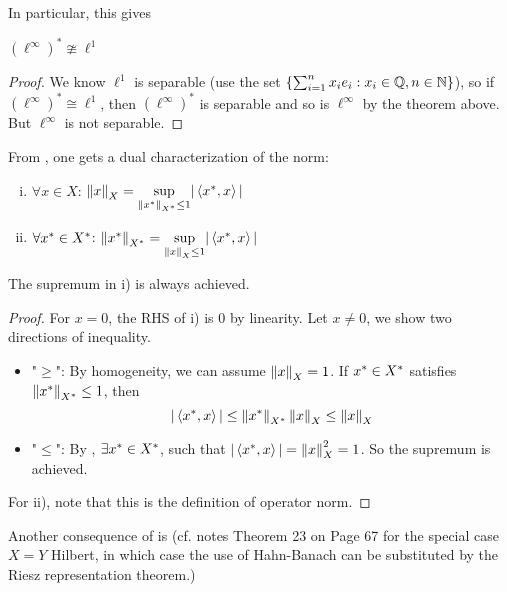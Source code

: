 \documentclass{article}
\begin{document}
In particular, this gives  

\begin{corollary}
    $(\ell^{\infty})^* \ncong \ell^1$
\end{corollary}
\begin{proof}
    We know $\ell^1$ is separable (use the set $\{\sum_{i=1}^n x_i e_i: x_i \in \mathbb{Q}, n \in \mathbb{N}\}$), so if $(\ell^{\infty})^* \cong \ell^1$, then $(\ell^{\infty})^*$ is separable and so is $\ell^{\infty}$ by the theorem above. But $\ell^{\infty}$ is not separable.
\end{proof} 

From , one gets a dual characterization of the norm:  

\begin{corollary}
\phantom{something}
\label{duality of norm}
\begin{enumerate}[i)]
    \item $\forall x \in X$: $\left\|{x}\right\|_X = \underset{{\left\|{x^*}\right\|_{{X}^*} \leq 1}}{\sup} |\left<{{x}^*},{x}\right>|$
    \item $\forall {x}^* \in {X}^*$: $\left\|{{x}^*}\right\|_{{X}^*} = \underset{{\left\|{x}\right\|_X \leq 1}}{\sup} |\left<{{x}^*},{x}\right>|$
\end{enumerate}
The supremum in i) is always achieved.  
\end{corollary}


\begin{proof}
For $x=0$, the RHS of i) is $0$ by linearity. Let $x \neq 0$, we show two directions of inequality.  
\begin{itemize}
    \item "$\geq$": By homogeneity, we can assume $\left\|{x}\right\|_X=1$. If ${x}^* \in {X}^*$ satisfies $\left\|{x^*}\right\|_{{X}^*} \leq 1$, then  
    $$|\left<{{x}^*},{x}\right>| \leq \left\|{x^*}\right\|_{{X}^*} \left\|{x}\right\|_X \leq \left\|{x}\right\|_X$$
    \item "$\leq$": By , $\exists {x}^* \in {X}^*$, such that $|\left<{{x}^*},{x}\right>|=\left\|{x}\right\|_X^2=1$. So the supremum is achieved.
\end{itemize}   

For ii), note that this is the definition of operator norm.   
\end{proof}

Another consequence of  is (cf. notes Theorem 23 on Page 67 for the special case $X=Y$ Hilbert, in which case the use of Hahn-Banach can be substituted by the Riesz representation theorem.)
\end{document}
